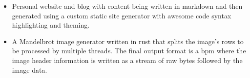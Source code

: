 \smallskip
{}
\begin{itemize}
	\item Personal website and blog with content being written in markdown and then generated using a
		custom static site generator with awesome code syntax highlighting and theming.
\end{itemize}
\smallskip
{}
\begin{itemize}
	\item A Mandelbrot image generator written in rust that splits the 
		image's rows to be processed by multiple threads. The final output format 
		is a bpm where the image header information is written as a stream of raw 
		bytes followed by the image data.
\end{itemize}
\smallskip

